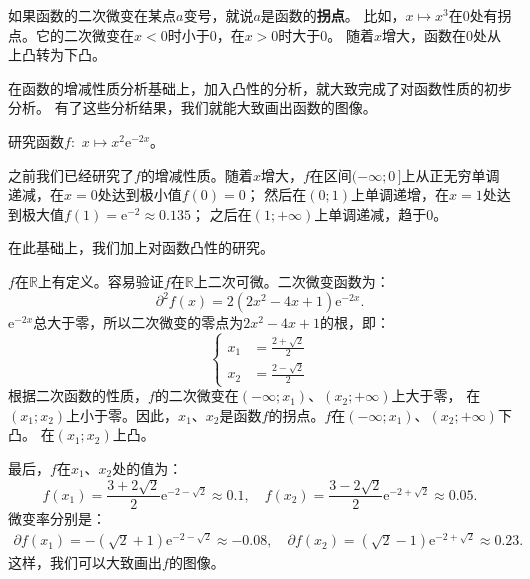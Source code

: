 \documentclass[12pt,UTF8]{ctexbook}
\begin{document}
如果函数的二次微变在某点$a$变号，就说$a$是函数的\textbf{拐点}。
比如，$x\mapsto x^3$在$0$处有拐点。它的二次微变在$x<0$时小于$0$，在$x>0$时大于$0$。
随着$x$增大，函数在$0$处从上凸转为下凸。

在函数的增减性质分析基础上，加入凸性的分析，就大致完成了对函数性质的初步分析。
有了这些分析结果，我们就能大致画出函数的图像。

\begin{et}
    研究函数$f:\,\,x\mapsto x^2 \mathrm{e}^{-2x}$。
\end{et}

\begin{so}

    之前我们已经研究了$f$的增减性质。随着$x$增大，$f$在区间$(-\infty; 0\,]$上从正无穷单调递减，在$x = 0$处达到极小值$f(0) = 0$；
    然后在$(0; 1)$上单调递增，在$x = 1$处达到极大值$f(1) = \mathrm{e}^{-2} \approx 0.135$；
    之后在$(1; +\infty)$上单调递减，趋于$0$。

    在此基础上，我们加上对函数凸性的研究。

    $f$在$\mathbb{R}$上有定义。容易验证$f$在$\mathbb{R}$上二次可微。二次微变函数为：
    $$ \partial^2 f (x) = 2(2x^2 - 4x + 1)\mathrm{e}^{-2x}.$$
    $\mathrm{e}^{-2x}$总大于零，所以二次微变的零点为$2x^2 - 4x + 1$的根，即：
    $$  
        \left\{ 
            \begin{array}{cl}
                x_1 &= \frac{2 + \sqrt{2}}{2} \\
                x_2 &= \frac{2 - \sqrt{2}}{2} 
            \end{array}
        \right.
    $$
    根据二次函数的性质，$f$的二次微变在$(-\infty; x_1)$、$(x_2; +\infty)$上大于零，
    在$(x_1; x_2)$上小于零。因此，$x_1$、$x_2$是函数$f$的拐点。$f$在$(-\infty; x_1)$、$(x_2; +\infty)$下凸。
    在$(x_1; x_2)$上凸。

    最后，$f$在$x_1$、$x_2$处的值为：
    $$ f(x_1) = \frac{3 + 2\sqrt{2}}{2} \mathrm{e}^{-2-\sqrt{2}} \approx 0.1, \quad f(x_2) = \frac{3 - 2\sqrt{2}}{2} \mathrm{e}^{-2+\sqrt{2}} \approx 0.05. $$
    微变率分别是：
    \begin{align*}
        \partial f(x_1) = -(\sqrt{2} + 1)\mathrm{e}^{-2-\sqrt{2}} \approx -0.08, \quad  \partial f(x_2) = (\sqrt{2} - 1)\mathrm{e}^{-2+\sqrt{2}} \approx 0.23. 
    \end{align*}
    这样，我们可以大致画出$f$的图像。
\end{so}
\end{document}
